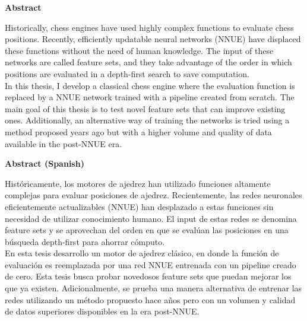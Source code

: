\thispagestyle{plain}
\begin{center}
\large
\textbf{Abstract}
\end{center}

\begin{center}
\parbox{15cm}{
Historically, chess engines have used highly complex functions to evaluate chess positions. Recently, efficiently updatable neural networks (NNUE) have displaced these functions without the need of human knowledge. The input of these networks are called feature sets, and they take advantage of the order in which positions are evaluated in a depth-first search to save computation. \\

In this thesis, I develop a classical chess engine where the evaluation function is replaced by a NNUE network trained with a pipeline created from scratch. The main goal of this thesis is to test novel feature sets that can improve existing ones. Additionally, an alternative way of training the networks is tried using a method proposed years ago but with a higher volume and quality of data available in the post-NNUE era.
}
\end{center}

\vspace{1cm}

\begin{center}
\large
\textbf{Abstract (Spanish)}
\end{center}

\begin{center}
\parbox{15cm}{
Históricamente, los motores de ajedrez han utilizado funciones altamente complejas para evaluar posiciones de ajedrez. Recientemente, las redes neuronales eficientemente actualizables (NNUE) han desplazado a estas funciones sin necesidad de utilizar conocimiento humano. El input de estas redes se denomina feature sets y se aprovechan del orden en que se evalúan las posiciones en una búsqueda depth-first para ahorrar cómputo. \\

En esta tesis desarrollo un motor de ajedrez clásico, en donde la función de evaluación es reemplazada por una red NNUE entrenada con un pipeline creado de cero. Esta tesis busca probar novedosos feature sets que puedan mejorar los que ya existen. Adicionalmente, se prueba una manera alternativa de entrenar las redes utilizando un método propuesto hace años pero con un volumen y calidad de datos superiores disponibles en la era post-NNUE.
}
\end{center}

\clearpage
